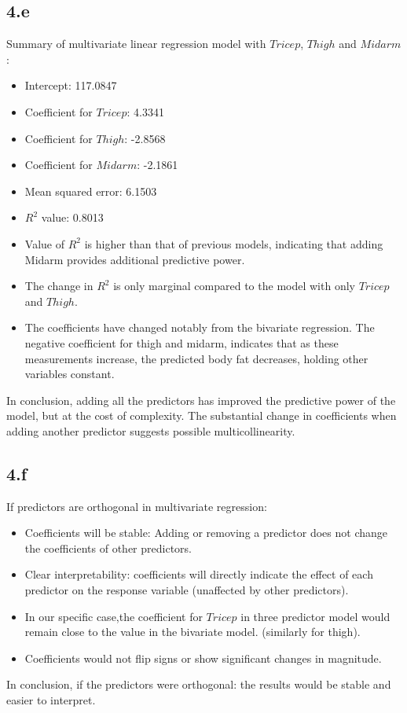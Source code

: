 \documentclass[12pt]{article}
\begin{document}
\subsection*{4.e}
Summary of multivariate linear regression model with \(Tricep\), \(Thigh\) and
\(Midarm\):
\begin{itemize}
    \item Intercept: 117.0847
    \item Coefficient for \(Tricep\): 4.3341
    \item Coefficient for \(Thigh\): -2.8568
    \item Coefficient for \(Midarm\): -2.1861
    \item Mean squared error: 6.1503
    \item \(R^2\) value: 0.8013
    \item Value of \(R^2\) is higher than that of previous models, indicating
    that adding Midarm provides additional predictive power.
    \item The change in \(R^2\) is only marginal compared to the model with
    only \(Tricep\) and \(Thigh\).
    \item The coefficients have changed notably from the bivariate regression.
    The negative coefficient for thigh and midarm, indicates that as these
    measurements increase, the predicted body fat decreases,
    holding other variables constant.
\end{itemize}
In conclusion, adding all the predictors has improved the predictive power of
the model, but at the cost of complexity. The substantial change in coefficients
when adding another predictor suggests possible multicollinearity.

\newpage
\subsection*{4.f}
If predictors are orthogonal in multivariate regression:
\begin{itemize}
    \item Coefficients will be stable: Adding or removing a predictor does not
    change the coefficients of other predictors.
    \item Clear interpretability: coefficients will directly indicate the effect
    of each predictor on the response variable (unaffected by other predictors).
    \item In our specific case,the coefficient for \(Tricep\)  in three predictor
    model would remain close to the value in the bivariate model. (similarly for thigh).
    \item Coefficients would not flip signs or show significant changes in magnitude.
\end{itemize}
In conclusion, if the predictors were orthogonal: the results would be stable
and easier to interpret.
\end{document}
